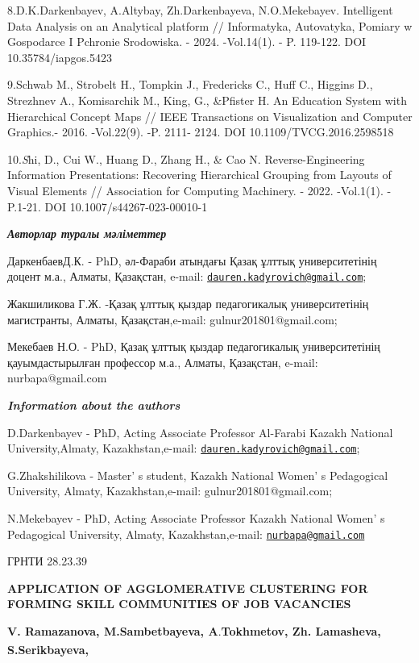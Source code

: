 8.D.K.Darkenbayev, A.Altybay, Zh.Darkenbayeva, N.O.Mekebayev.
Intelligent Data Analysis on an Analytical platform // Informatyka,
Autovatyka, Pomiary w Gospodarce I Pchronie Srodowiska. - 2024.
-Vol.14(1). - P. 119-122. DOI 10.35784/iapgos.5423

9.Schwab M., Strobelt H., Tompkin J., Fredericks C., Huff C., Higgins
D., Strezhnev A., Komisarchik M., King, G., \&Pfister H. An Education
System with Hierarchical Concept Maps // IEEE Transactions on
Visualization and Computer Graphics.- 2016. -Vol.22(9). -P. 2111- 2124.
DOI 10.1109/TVCG.2016.2598518

10.\emph{S}hi, D., Cui W., Huang D., Zhang H., \& Cao N.
Reverse-Engineering Information Presentations: Recovering Hierarchical
Grouping from Layouts of Visual Elements // Association for Computing
Machinery. - 2022. -Vol.1(1). - P.1-21. DOI 10.1007/s44267-023-00010-1

\emph{{\bfseries Авторлар туралы мәліметтер}}

ДаркенбаевД.К. - PhD, әл-Фараби атындағы Қазақ ұлттық университетінің
доцент м.а., Алматы, Қазақстан, e-mail:
\href{mailto:dauren.kadyrovich@gmail.com}{\nolinkurl{dauren.kadyrovich@gmail.com}};

Жакшиликова Г.Ж. -Қазақ ұлттық қыздар педагогикалық университетінің
магистранты, Алматы, Қазақстан,e-mail: gulnur201801@gmail.com;

Мекебаев Н.О. - PhD, Қазақ ұлттық қыздар педагогикалық университетінің
қауымдастырылған профессор м.а., Алматы, Қазақстан, e-mail:
nurbapa@gmail.com

\emph{{\bfseries Information about the authors}}

D.Darkenbayev - PhD, Acting Associate Professor Al-Farabi Kazakh
National University,Almaty, Kazakhstan,e-mail:
\href{mailto:dauren.kadyrovich@gmail.com}{\nolinkurl{dauren.kadyrovich@gmail.com}};

G.Zhakshilikova - Master' s student, Kazakh National
Women' s Pedagogical University, Almaty,
Kazakhstan,e-mail: gulnur201801@gmail.com;

N.Mekebayev - PhD, Acting Associate Professor Kazakh National
Women' s Pedagogical University, Almaty,
Kazakhstan,e-mail:
\href{mailto:nurbapa@gmail.com}{\nolinkurl{nurbapa@gmail.com}}

ГРНТИ 28.23.39

{\bfseries APPLICATION OF AGGLOMERATIVE CLUSTERING FOR FORMING SKILL
COMMUNITIES OF JOB VACANCIES}

{\bfseries V. Ramazanova, M.Sambetbayeva, A}.{\bfseries Tokhmetov, Zh.
Lamasheva, S.Serikbayeva\textsuperscript{\envelope },}

